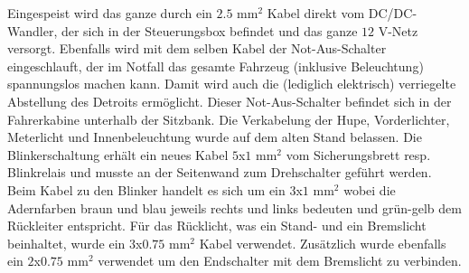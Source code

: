 Eingespeist wird das ganze durch ein $2.5$ mm$^2$ Kabel direkt vom DC/DC-Wandler, der sich in der Steuerungsbox befindet und das ganze $12$ V-Netz versorgt. Ebenfalls wird mit dem selben Kabel der Not-Aus-Schalter eingeschlauft, der im Notfall das gesamte Fahrzeug (inklusive Beleuchtung) spannungslos machen kann. Damit wird auch die (lediglich elektrisch) verriegelte Abstellung des Detroits ermöglicht. Dieser Not-Aus-Schalter befindet sich in der Fahrerkabine unterhalb der Sitzbank. Die Verkabelung der Hupe, Vorderlichter, Meterlicht und Innenbeleuchtung wurde auf dem alten Stand belassen. Die Blinkerschaltung erhält ein neues Kabel $5$x$1$ mm$^2$ vom Sicherungsbrett resp. Blinkrelais und musste an der Seitenwand zum Drehschalter geführt werden. Beim Kabel zu den Blinker handelt es sich um ein $3$x$1$ mm$^2$ wobei die Adernfarben braun und blau jeweils rechts und links bedeuten und grün-gelb dem Rückleiter entspricht. Für das Rücklicht, was ein Stand- und ein Bremslicht beinhaltet, wurde ein $3$x$0.75$ mm$^2$ Kabel verwendet. Zusätzlich wurde ebenfalls ein $2$x$0.75$ mm$^2$ verwendet um den Endschalter mit dem Bremslicht zu verbinden.

\color{black}